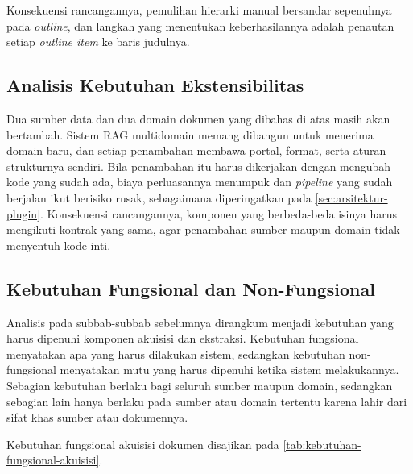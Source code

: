 Konsekuensi rancangannya, pemulihan hierarki manual bersandar sepenuhnya pada \textit{outline}, dan langkah yang menentukan keberhasilannya adalah penautan setiap \textit{outline item} ke baris judulnya.

\subsection{Analisis Kebutuhan Ekstensibilitas}
\label{sec:analisis-keragaman}

Dua sumber data dan dua domain dokumen yang dibahas di atas masih akan bertambah.
Sistem RAG multidomain memang dibangun untuk menerima domain baru, dan setiap penambahan membawa portal, format, serta aturan strukturnya sendiri.
Bila penambahan itu harus dikerjakan dengan mengubah kode yang sudah ada, biaya perluasannya menumpuk dan \textit{pipeline} yang sudah berjalan ikut berisiko rusak, sebagaimana diperingatkan pada \autoref{sec:arsitektur-plugin}.
Konsekuensi rancangannya, komponen yang berbeda-beda isinya harus mengikuti kontrak yang sama, agar penambahan sumber maupun domain tidak menyentuh kode inti.

\subsection{Kebutuhan Fungsional dan Non-Fungsional}
\label{sec:kebutuhan}

Analisis pada subbab-subbab sebelumnya dirangkum menjadi kebutuhan yang harus dipenuhi komponen akuisisi dan ekstraksi.
Kebutuhan fungsional menyatakan apa yang harus dilakukan sistem, sedangkan kebutuhan non-fungsional menyatakan mutu yang harus dipenuhi ketika sistem melakukannya.
Sebagian kebutuhan berlaku bagi seluruh sumber maupun domain, sedangkan sebagian lain hanya berlaku pada sumber atau domain tertentu karena lahir dari sifat khas sumber atau dokumennya.

Kebutuhan fungsional akuisisi dokumen disajikan pada \autoref{tab:kebutuhan-fungsional-akuisisi}.

